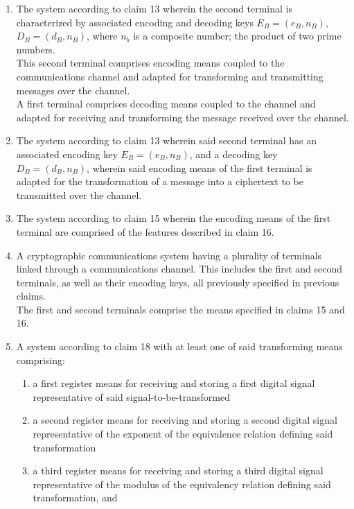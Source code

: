 \documentclass[12pt, a4paper]{article}
\begin{document}
\begin{enumerate}
\item The system according to claim 13 wherein the second terminal is characterized by associated encoding and decoding keys $E_B=(e_B, n_B)$, $D_B = (d_B, n_B)$, where $n_b$ is a composite number; the product of two prime numbers.\\
This second terminal comprises encoding means coupled to the communications channel and adapted for transforming and transmitting messages over the channel.\\
A first terminal comprises decoding means coupled to the channel and adapted for receiving and transforming the message received over the channel.

\item The system according to claim 13 wherein said second terminal has an associated encoding key $E_B = (e_B, n_B)$, and a decoding key $D_B = (d_B, n_B)$, wherein said encoding means of the first terminal is adapted for the transformation of a message into a ciphertext to be transmitted over the channel.


\item The system according to claim 15 wherein the encoding means of the first terminal are comprised of the features described in claim 16.

\item A cryptographic communications system having a plurality of terminals linked through a communications channel. This includes the first and second terminals, as well as their encoding keys, all previously specified in previous claims.\\
The first and second terminals comprise the means specified in claims 15 and 16.

\item A system according to claim 18 with at least one of said transforming means comprising:
    \begin{enumerate}

    \item a first register means for receiving and storing a first digital signal representative of said signal-to-be-transformed
    
    \item a second register means for receiving and storing a second digital signal representative of the exponent of the equivalence relation defining said transformation
    
    \item a third register means for receiving and storing a third digital signal representative of the modulus of the equivalency relation defining said transformation, and
    

\end{enumerate}
\end{enumerate}
\end{document}
